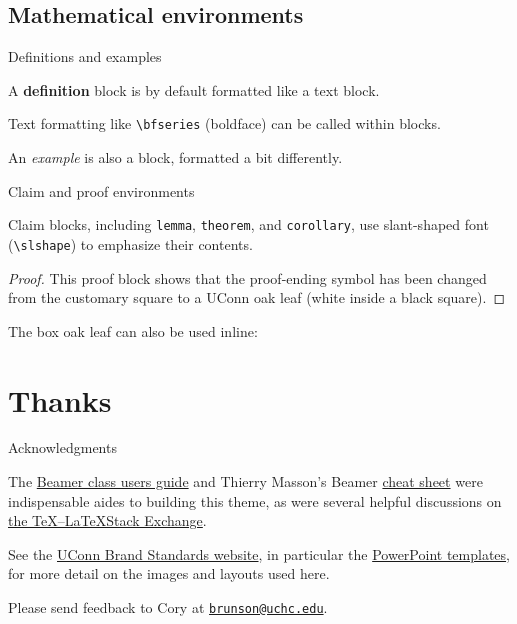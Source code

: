 \documentclass{beamer}
\begin{document}
\subsection{Mathematical environments}


\begin{frame}[fragile]{Definitions and examples}

\begin{definition}
A {\bfseries definition} block is by default formatted like a text block.
\end{definition}

Text formatting like \verb|\bfseries| (boldface) can be called within blocks.

\begin{example}
An \emph{example} is also a block, formatted a bit differently.
\end{example}

\end{frame}


\begin{frame}[fragile]{Claim and proof environments}

\begin{theorem}
Claim blocks, including \verb|lemma|, \verb|theorem|, and \verb|corollary|, use slant-shaped font (\verb|\slshape|) to emphasize their contents.
\end{theorem}

\begin{proof}
This proof block shows that the proof-ending symbol has been changed from the customary square to a UConn oak leaf (white inside a black square).
\end{proof}

\begin{corollary}
The box oak leaf can also be used inline: \oakleafbox
\end{corollary}

\end{frame}


\section{Thanks}


\begin{frame}{Acknowledgments}

The \href{http://tug.ctan.org/macros/latex/contrib/beamer/doc/beameruserguide.pdf}{Beamer class users guide} and Thierry Masson's Beamer \href{http://www.cpt.univ-mrs.fr/~masson/latex/Beamer-appearance-cheat-sheet.pdf}{cheat sheet} were indispensable aides to building this theme, as were several helpful discussions on \href{https://tex.stackexchange.com/}{the \TeX--\LaTeX Stack Exchange}.

See the \href{http://brand.uconn.edu/}{UConn Brand Standards website}, in particular the \href{http://brand.uconn.edu/resources/powerpoint-templates/}{PowerPoint templates}, for more detail on the images and layouts used here.

Please send feedback to Cory at \href{mailto:brunson@uchc.edu}{\tt brunson@uchc.edu}.

\end{frame}
\end{document}
